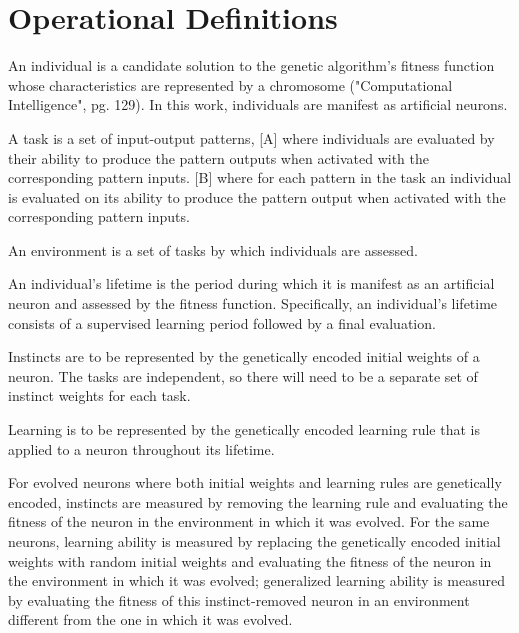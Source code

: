\documentclass[master]{outhesis}
\begin{document}
\chapter{Operational Definitions}

An individual is a candidate solution to the genetic algorithm's fitness function whose characteristics are represented by a chromosome ("Computational Intelligence", pg. 129). In this work, individuals are manifest as artificial neurons. 

A task is a set of input-output patterns, 
[A] where individuals are evaluated by their ability to produce the pattern outputs when activated with the corresponding pattern inputs.
[B] where for each pattern in the task an individual is evaluated on its ability to produce the pattern output when activated with the corresponding pattern inputs.

An environment is a set of tasks by which individuals are assessed.

An individual's lifetime is the period during which it is manifest as an artificial neuron and assessed by the fitness function. Specifically, an individual's lifetime consists of a supervised learning period followed by a final evaluation.

Instincts are to be represented by the genetically encoded initial weights of a neuron. The tasks are independent, so there will need to be a separate set of instinct weights for each task.

Learning is to be represented by the genetically encoded learning rule that is applied to a neuron throughout its lifetime.

For evolved neurons where both initial weights and learning rules are genetically encoded, instincts are measured by removing the learning rule and evaluating the fitness of the neuron in the environment in which it was evolved.
For the same neurons, learning ability is measured by replacing the genetically encoded initial weights with random initial weights and evaluating the fitness of the neuron in the environment in which it was evolved; generalized learning ability is measured by evaluating the fitness of this instinct-removed neuron in an environment different from the one in which it was evolved.

\end{document}
